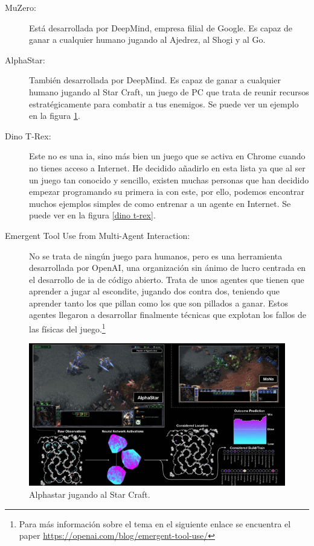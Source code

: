 \begin{description}
	\item[MuZero:] Está desarrollada por DeepMind, empresa filial de  Google. Es capaz de ganar a cualquier humano jugando al Ajedrez, al Shogi y al Go.
	\item[AlphaStar:] También desarrollada por DeepMind. Es capaz de ganar a cualquier humano jugando al Star Craft, un juego de PC que trata de reunir recursos estratégicamente para combatir a tus enemigos. Se puede ver un ejemplo en la figura \ref{alphastar}.
	\item[Dino T-Rex:] Este no es una \gls{ia}, sino más bien un juego que se activa en Chrome cuando no tienes acceso a Internet. He decidido añadirlo en esta lista ya que al ser un juego tan conocido y sencillo, existen muchas personas que han decidido empezar programando su primera \gls{ia} con este, por ello, podemos encontrar muchos ejemplos simples de como entrenar a un agente en Internet. Se puede ver en la figura \ref{dino t-rex}.
	\item[Emergent Tool Use from Multi-Agent Interaction:] No se trata de ningún juego para humanos, pero es una herramienta desarrollada por OpenAI, una organización sin ánimo de lucro centrada en el desarrollo de \gls{ia} de código abierto. Trata de unos agentes que tienen que aprender a jugar al escondite, jugando dos contra dos, teniendo que aprender tanto los que pillan como los que son pillados a ganar. Estos agentes llegaron a desarrollar finalmente técnicas que explotan los fallos de las físicas del juego.\footnote{Para más información sobre el tema en el siguiente enlace se encuentra el paper \url{https://openai.com/blog/emergent-tool-use/}}
\end{description}
\begin{figure}[H]
	\centering
	\includegraphics[width=14cm]{archivos/imagenes/alphastar-playing.png}
	\caption[Alphastar jugando al Star Craft.]{Alphastar jugando al Star Craft\footnotemark.}
	\label{alphastar}
\end{figure}
